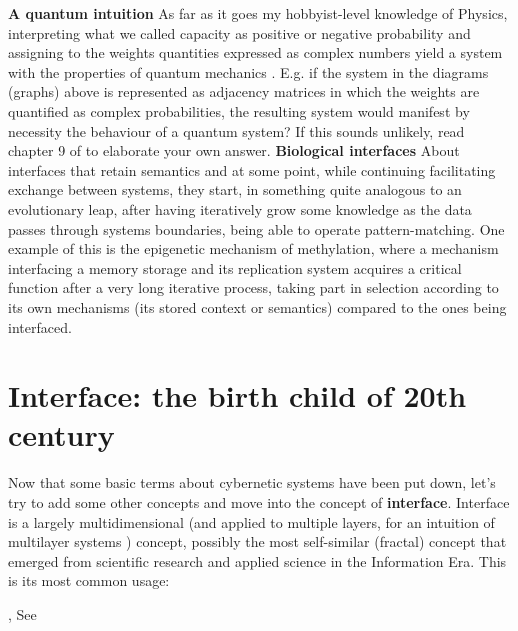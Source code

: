 \documentclass[14pt,a4paper]{extarticle}
\begin{document}
\newline
\hspace*{7.5mm}\textbf{A quantum intuition}
\newline
As far as it goes my hobbyist-level knowledge of Physics, interpreting what we called capacity as positive or negative probability and assigning to the weights quantities expressed as complex numbers yield a system with the properties of quantum mechanics \cite{Aaronson10.5555/2487754}. E.g. if the system in the diagrams (graphs) above is represented as adjacency matrices in which the weights are quantified as complex probabilities, the resulting system would manifest by necessity the behaviour of a quantum system? If this sounds unlikely, read chapter 9 of \cite{Aaronson10.5555/2487754} to elaborate your own answer.
\newline
\hspace*{7.5mm}\textbf{Biological interfaces}
\newline
About interfaces that retain semantics and at some point, while continuing facilitating exchange between systems, they start, in something quite analogous to an evolutionary leap, after having iteratively grow some knowledge as the data passes through systems boundaries, being able to operate pattern-matching. One example of this is the epigenetic mechanism of methylation, where a mechanism interfacing a memory storage and its replication system acquires a critical function after a very long iterative process, taking part in selection according to its own mechanisms (its stored context or semantics) compared to the ones being interfaced.

\section*{Interface: the birth child of 20th century}
\label{sec:interface}%

\hspace*{15mm}Now that some basic terms about cybernetic systems have been put down, let’s try to add some other concepts and move into the concept of \textbf{interface}. Interface is a largely multidimensional (and applied to multiple layers, for an intuition of multilayer systems \cite{Shchurov2015,Grassi2021,Thakare2021,Thakare20212}) concept, possibly the most self-similar (fractal) concept that emerged from scientific research and applied science in the Information Era. This is its most common usage:
\begin{center}
\begin{minipage}[t]{0.75\linewidth}
, See \cite{ETYMOinterface}
\end{minipage}
\end{center}
\end{document}
